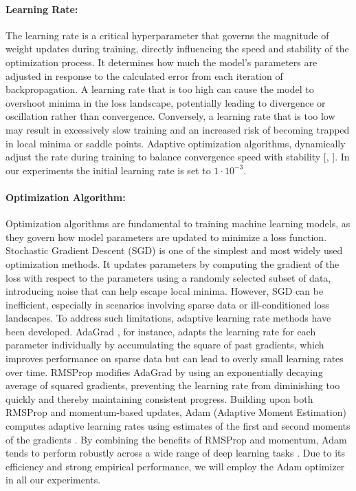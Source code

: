 \paragraph{Learning Rate:} The learning rate is a critical hyperparameter that governs the magnitude of weight updates during training, directly influencing the speed and stability of the optimization process. It determines how much the model's parameters are adjusted in response to the calculated error from each iteration of backpropagation. A learning rate that is too high can cause the model to overshoot minima in the loss landscape, potentially leading to divergence or oscillation rather than convergence. Conversely, a learning rate that is too low may result in excessively slow training and an increased risk of becoming trapped in local minima or saddle points. Adaptive optimization algorithms, dynamically adjust the rate during training to balance convergence speed with stability [\cite{Berahmand24}, \cite{Charte18}]. In our experiments the initial learning rate is set to $1\cdot10^{-3}$.

\paragraph{Optimization Algorithm:} Optimization algorithms are fundamental to training machine learning models, as they govern how model parameters are updated to minimize a loss function. Stochastic Gradient Descent (SGD) is one of the simplest and most widely used optimization methods. It updates parameters by computing the gradient of the loss with respect to the parameters using a randomly selected subset of data, introducing noise that can help escape local minima. However, SGD can be inefficient, especially in scenarios involving sparse data or ill-conditioned loss landscapes. To address such limitations, adaptive learning rate methods have been developed. AdaGrad \cite{Adagrad}, for instance, adapts the learning rate for each parameter individually by accumulating the square of past gradients, which improves performance on sparse data but can lead to overly small learning rates over time. RMSProp \cite{RMSProp} modifies AdaGrad by using an exponentially decaying average of squared gradients, preventing the learning rate from diminishing too quickly and thereby maintaining consistent progress. Building upon both RMSProp and momentum-based updates, Adam (Adaptive Moment Estimation) \cite{Adam} computes adaptive learning rates using estimates of the first and second moments of the gradients \cite{Berahmand24}. By combining the benefits of RMSProp and momentum, Adam tends to perform robustly across a wide range of deep learning tasks \cite{Charte18}. Due to its efficiency and strong empirical performance, we will employ the Adam optimizer in all our experiments.

